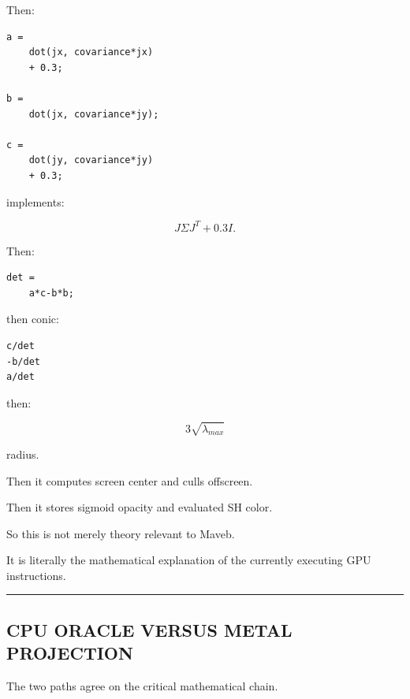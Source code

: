 Then:

\protect{}\label{bd7vol}%
\begin{verbatim}
a =
    dot(jx, covariance*jx)
    + 0.3;

b =
    dot(jx, covariance*jy);

c =
    dot(jy, covariance*jy)
    + 0.3;
\end{verbatim}

implements:

\[
J\Sigma J^T+0.3I.
\]

Then:

\protect{}\label{tf2x2w}%
\begin{verbatim}
det =
    a*c-b*b;
\end{verbatim}

then conic:

\protect{}\label{qebz4r}%
\begin{verbatim}
c/det
-b/det
a/det
\end{verbatim}

then:

\[
3\sqrt{\lambda_{max}}
\]

radius.

Then it computes screen center and culls offscreen.

Then it stores sigmoid opacity and evaluated SH color.

So this is not merely theory relevant to Maveb.

It is literally the mathematical explanation of the currently executing GPU instructions.

\begin{center}\rule{0.5\linewidth}{0.5pt}\end{center}

\subsection{CPU ORACLE VERSUS METAL PROJECTION}\label{04-visual-computing-ii-ch038-cpu-oracle-versus-metal-projection}

The two paths agree on the critical mathematical chain.

